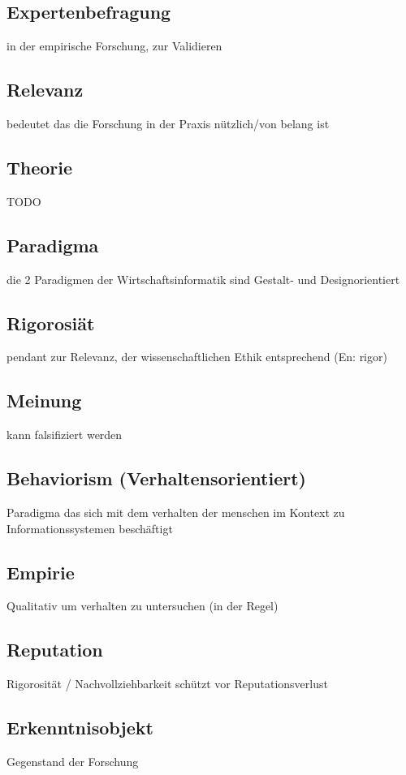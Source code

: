 \documentclass[DIV=calc, paper=a4, fontsize=11pt, twocolumn]{scrartcl}	 %
\begin{document}
\subsection*{Expertenbefragung}
in der empirische Forschung, zur Validieren

\subsection*{Relevanz}
bedeutet das die Forschung in der Praxis n\"utzlich/von belang ist

\subsection*{Theorie}
TODO

\subsection*{Paradigma}
die 2 Paradigmen der Wirtschaftsinformatik sind Gestalt- und Designorientiert

\subsection*{Rigorosi\"at}
pendant zur Relevanz, der wissenschaftlichen Ethik entsprechend (En: rigor)

\subsection*{Meinung}
kann falsifiziert werden

\subsection*{Behaviorism (Verhaltensorientiert)}
Paradigma das sich mit dem verhalten der menschen im Kontext zu Informationssystemen besch\"aftigt

\subsection*{Empirie}
Qualitativ um verhalten zu untersuchen (in der Regel)

\subsection*{Reputation}
Rigorosit\"at / Nachvollziehbarkeit sch\"utzt vor Reputationsverlust

\subsection*{Erkenntnisobjekt}
Gegenstand der Forschung
\end{document}
